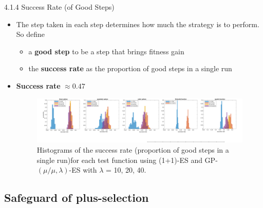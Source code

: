 \documentclass{beamer}
\begin{document}
\begin{frame}{4.1.4 Success Rate (of Good Steps)}
\begin{itemize}
    \item The step taken in each step determines how much the strategy is to perform. So define 
        \begin{itemize}
            \item a \textbf{good step} to be a step that brings fitness gain
            \item the \textbf{success rate} as the proportion of good steps in a single run 
        \end{itemize}
    \item \textbf{Success rate} $\approx 0.47$
\begin{figure}
\includegraphics[width=1.0\linewidth]{success_NO_emergency_v3_final.pdf}
    \caption{Histograms of the success rate (proportion of good steps in a single run)for each test function using (1+1)-ES and GP-$(\mu/\mu,\lambda)$-ES with $\lambda$ = 10, 20, 40.}
\end{figure}
\end{itemize}
\end{frame}


\subsection{Safeguard of plus-selection}
\end{document}
